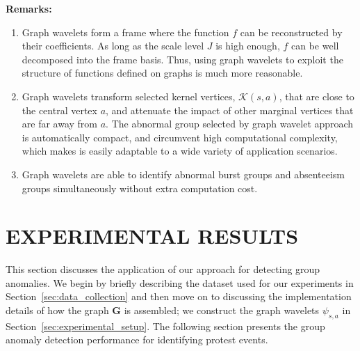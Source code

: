 \documentclass[twoside,leqno,twocolumn]{article}
\begin{document}
{\textbf{Remarks:}}
\begin{enumerate}
\item Graph wavelets form a frame where the function $f$ can be reconstructed by their coefficients.
As long as the scale level $J$ is high enough, $f$ can be well decomposed into the frame basis. Thus, using graph wavelets to exploit the structure of functions defined on graphs is much more reasonable.
\item Graph wavelets transform selected kernel vertices, $\mathcal{K}(s,a)$, that are close to the central vertex $a$, and attenuate the impact of other marginal vertices that are far away from $a$. The abnormal group selected by graph wavelet approach is automatically compact, and circumvent high computational complexity, which makes is easily adaptable to a wide variety of application scenarios.
\item Graph wavelets are able to identify abnormal burst groups and absenteeism groups simultaneously without extra computation cost.
\end{enumerate}



\section{EXPERIMENTAL RESULTS} \label{sec:experiment}
This section discusses the application of our approach for detecting group anomalies. We begin by briefly describing the dataset used for our experiments in Section~\ref{sec:data_collection} and then move on to discussing the implementation details of how the graph $\mathbf{G}$ is assembled; we construct the graph wavelets $\psi_{s,a}$ in Section~\ref{sec:experimental_setup}. The following section presents the group anomaly detection performance for identifying protest events.
\end{document}
